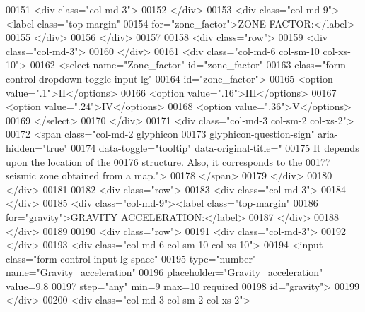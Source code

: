 \begin{DoxyCode}
00151                     <div class="col-md-3">
00152                     </div>
00153                     <div class="col-md-9"><label class="top-margin"
00154                         for="zone\_factor">ZONE FACTOR:</label>
00155                     </div>
00156                 </div>
00157                 
00158                 <div class="row">
00159                     <div class="col-md-3">
00160                     </div>
00161                     <div class="col-md-6 col-sm-10 col-xs-10">
00162                         <select name="Zone\_factor" id="zone\_factor"
00163                         class="form-control dropdown-toggle input-lg"
00164                         id="zone\_factor">
00165                             <option value=".1">II</options>
00166                             <option value=".16">III</options>
00167                             <option value=".24">IV</options>
00168                             <option value=".36">V</options>
00169                         </select>
00170                     </div>
00171                     <div class="col-md-3 col-sm-2 col-xs-2">
00172                         <span class="col-md-2 glyphicon 
00173                             glyphicon-question-sign" aria-hidden="true" 
00174                             data-toggle="tooltip" data-original-title="
00175                             It depends upon the location of the 
00176                             structure. Also, it corresponds to the
00177                             seismic zone obtained from a map.">
00178                         </span>
00179                     </div>
00180                 </div>
00181 
00182                 <div class="row">
00183                     <div class="col-md-3">
00184                     </div>
00185                     <div class="col-md-9"><label class="top-margin"
00186                         for="gravity">GRAVITY ACCELERATION:</label>
00187                     </div>
00188                 </div>
00189 
00190                 <div class="row">
00191                     <div class="col-md-3">
00192                     </div>
00193                     <div class="col-md-6 col-sm-10 col-xs-10">
00194                         <input class="form-control input-lg space"
00195                         type="number" name="Gravity\_acceleration"
00196                         placeholder="Gravity\_acceleration" value=9.8
00197                         step="any" min=9 max=10 required 
00198                         id="gravity">
00199                     </div>
00200                     <div class="col-md-3 col-sm-2 col-xs-2">

\end{DoxyCode}

